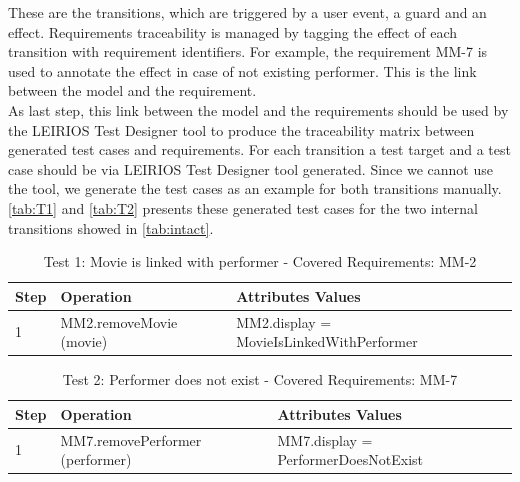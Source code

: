 These are the transitions, which are triggered by a user event, a guard and an effect. Requirements traceability is managed by tagging the effect of each transition with requirement identifiers. For example, the requirement MM-7 is used to annotate the effect in case of not existing performer. This is the link between the model and the requirement. \\
As last step, this link between the model and the requirements should be used by the LEIRIOS Test Designer tool to produce the traceability matrix between generated test cases and requirements. For each transition a test target and a test case should be via LEIRIOS Test Designer tool generated. Since we cannot use the tool, we generate the test cases as an example for both transitions manually. \autoref{tab:T1} and \autoref{tab:T2} presents these generated test cases for the two internal transitions showed in \autoref{tab:intact}.

\begin{table} [H] 
  \begin{center}
  \begin{small}
\caption{Test 1: Movie is linked with performer - Covered Requirements: MM-2}
\label{tab:T1}
\begin{tabular}{ m{0.8cm} | m{5cm} | m{7.3cm} }
\hline
\textbf{Step}& \textbf{Operation}&\textbf{Attributes Values}   \\
\hline
1 & MM2.removeMovie (movie)& MM2.display = MovieIsLinkedWithPerformer\\
\hline
\end{tabular}
\end{small}
 \end{center}
\end{table}
\begin{table} [H] 
\begin{center}
 \begin{small}
\caption{Test 2: Performer does not exist - Covered Requirements: MM-7}
\label{tab:T2}
\begin{tabular}{  m{0.8cm} | m{5cm} | m{7.3cm}  }
\hline
\textbf{Step}& \textbf{Operation}&\textbf{Attributes Values}   \\
\hline
1 & MM7.removePerformer (performer) & MM7.display = PerformerDoesNotExist\\
\hline
\end{tabular}
\end{small}
 \end{center}
\end{table}



